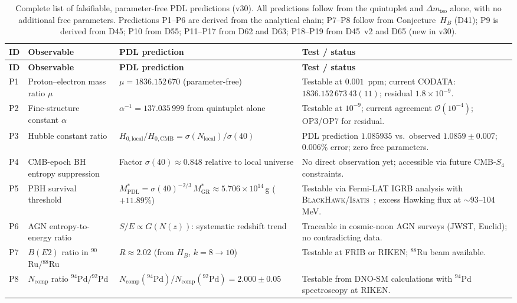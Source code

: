 \documentclass[11pt,a4paper]{article}
\theoremstyle{plain}
\theoremstyle{definition}
\theoremstyle{remark}
\begin{document}
\begin{longtable}{L{0.5cm}L{3.2cm}L{5.2cm}L{4.2cm}}
\caption{Complete list of falsifiable, parameter-free PDL predictions (v30). All predictions follow from the quintuplet and $\Delta m_{\mathrm{iso}}$ alone, with no additional free parameters. Predictions P1--P6 are derived from the analytical chain; P7--P8 follow from Conjecture~$H_B$ (D41); P9 is derived from D45; P10 from D55; P11--P17 from D62 and D63; P18--P19 from D45~v2 and D65 (new in v30).}
\label{tab:predictions}\\
\toprule
\textbf{ID} & \textbf{Observable} & \textbf{PDL prediction} & \textbf{Test / status}\\
\midrule
\endfirsthead
\toprule
\textbf{ID} & \textbf{Observable} & \textbf{PDL prediction} & \textbf{Test / status}\\
\midrule
\endhead
\bottomrule
\endfoot
P1 & Proton--electron mass ratio $\mu$ & $\mu=1836.152\,670$ (parameter-free) & Testable at $0.001$~ppm; current CODATA: $1836.152\,673\,43(11)$; residual $1.8\times10^{-9}$.\\[0.4em]
P2 & Fine-structure constant $\alpha$ & $\alpha^{-1}=137.035\,999$ from quintuplet alone & Testable at $10^{-9}$; current agreement $\mathcal{O}(10^{-4})$; OP3/OP7 for residual.\\[0.4em]
P3 & Hubble constant ratio & $H_{0,\mathrm{local}}/H_{0,\mathrm{CMB}}=\sigma(N_{\mathrm{local}})/\sigma(40)$ & PDL prediction $1.085935$ vs.\ observed $1.0859\pm0.007$; $0.006\%$ error; zero free parameters.\\[0.4em]
P4 & CMB-epoch BH entropy suppression & Factor $\sigma(40)\approx 0.848$ relative to local universe & No direct observation yet; accessible via future CMB-$S_4$ constraints.\\[0.4em]
P5 & PBH survival threshold & $M^*_{\mathrm{PDL}}=\sigma(40)^{-2/3}\,M^*_{\mathrm{GR}}\approx 5.706\times10^{14}$\,g ($+11.89\%$) & Testable via Fermi-LAT IGRB analysis with \textsc{BlackHawk}/\textsc{Isatis}~\cite{D45}; excess Hawking flux at $\sim93$--$104$\,MeV.\\[0.4em]
P6 & AGN entropy-to-energy ratio & $S/E\propto G(N(z))$: systematic redshift trend & Traceable in cosmic-noon AGN surveys (JWST, Euclid); no contradicting data.\\[0.4em]
P7 & $B(E2)$ ratio in $^{90}$Ru/$^{88}$Ru & $R\approx 2.02$ (from $H_B$, $k=8\to10$) & Testable at FRIB or RIKEN; $^{88}$Ru beam available.\\[0.4em]
P8 & $N_{\mathrm{comp}}$ ratio $^{94}$Pd/$^{92}$Pd & $N_{\mathrm{comp}}(^{94}\mathrm{Pd})/N_{\mathrm{comp}}(^{92}\mathrm{Pd})=2.000\pm0.05$ & Testable from DNO-SM calculations with $^{94}$Pd spectroscopy at RIKEN.\\[0.4em]

\end{longtable}
\end{document}
